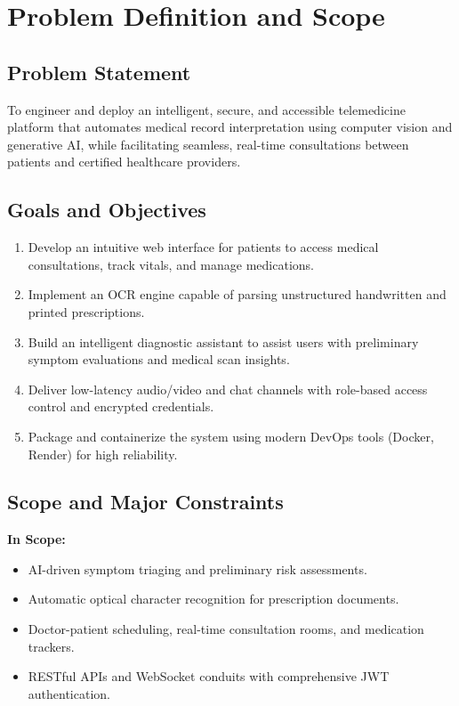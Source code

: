 \documentclass[12pt,a4paper]{report}
\begin{document}
\chapter{Problem Definition and Scope}

\section{Problem Statement}
To engineer and deploy an intelligent, secure, and accessible telemedicine platform that automates medical record interpretation using computer vision and generative AI, while facilitating seamless, real-time consultations between patients and certified healthcare providers.

\section{Goals and Objectives}
\begin{enumerate}[label=\arabic*.]
    \item Develop an intuitive web interface for patients to access medical consultations, track vitals, and manage medications.
    \item Implement an OCR engine capable of parsing unstructured handwritten and printed prescriptions.
    \item Build an intelligent diagnostic assistant to assist users with preliminary symptom evaluations and medical scan insights.
    \item Deliver low-latency audio/video and chat channels with role-based access control and encrypted credentials.
    \item Package and containerize the system using modern DevOps tools (Docker, Render) for high reliability.
\end{enumerate}

\section{Scope and Major Constraints}
\noindent \textbf{In Scope:}
\begin{itemize}
    \item AI-driven symptom triaging and preliminary risk assessments.
    \item Automatic optical character recognition for prescription documents.
    \item Doctor-patient scheduling, real-time consultation rooms, and medication trackers.
    \item RESTful APIs and WebSocket conduits with comprehensive JWT authentication.
\end{itemize}
\end{document}
